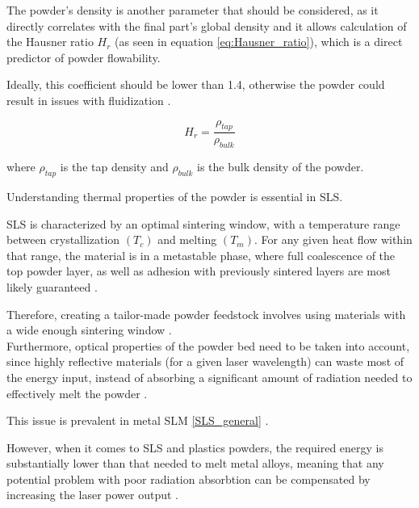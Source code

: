 \documentclass{article}
\begin{document}
    The powder's density is another parameter that should be considered, as it directly correlates with the final part's 
    global density and it allows calculation of the Hausner ratio $H_r$ (as seen in equation \ref{eq:Hausner_ratio}), which is a direct predictor of powder flowability. 
    
    Ideally, this coefficient should be lower than 1.4, otherwise the powder could result in issues with fluidization \autocite*{doi:10.1063/1.4918516}. 

    \begin{equation}
        H_r = \frac{\rho_{tap}}{\rho_{bulk}}
        \label{eq:Hausner_ratio}
    \end{equation} 

    where $\rho_{tap}$ is the tap density and $\rho_{bulk}$ is the bulk density of the powder. 

    \clearpage



    Understanding thermal properties of the powder is essential in SLS. 


    SLS is characterized by an optimal sintering window, with a temperature range between
    crystallization $(T_c)$ and melting $(T_m)$. 
    For any given heat flow within that range, the material is in a metastable phase, 
    where full coalescence of the top powder layer, as well as adhesion with previously sintered layers are 
    most likely guaranteed \autocite{doi:10.1063/1.4918516}. 

    Therefore, creating a tailor-made powder feedstock involves using materials with a wide enough 
    sintering window \autocites*{DechetMaximilianA2020OtDo}{doi:10.1063/1.4918516}. \\

    Furthermore, optical properties of the powder bed need to be taken into account, since highly reflective materials (for a given 
    laser wavelength) can waste most of the energy input, instead of absorbing a significant amount of radiation needed to 
    effectively melt the powder \autocite{doi:10.1063/1.4918516}.  

    This issue is prevalent in metal SLM \ref{SLS_general} \autocites{Latvian_additive}. 
    
    However, when it comes to SLS and plastics powders, the required energy is substantially lower than that needed to melt metal alloys, 
    meaning that any potential problem with poor radiation absorbtion can be compensated by increasing the 
    laser power output \autocite{doi:10.1063/1.4918516}. \\ 
    
\end{document}
